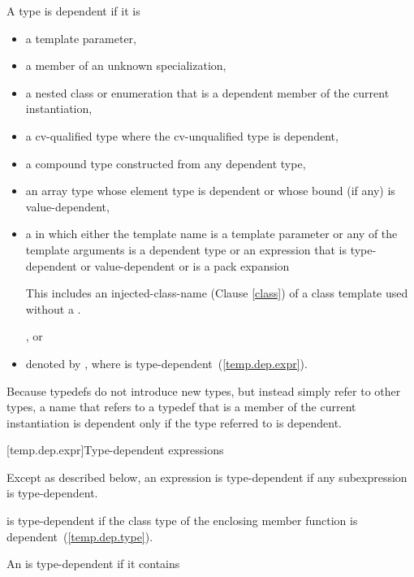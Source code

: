 \pnum
A type is dependent if it is
\begin{itemize}
\item
a template parameter,
\item
a member of an unknown specialization,
\item
a nested class or enumeration that is a dependent member of the current
instantiation,
\item
a cv-qualified type where the cv-unqualified type is dependent,
\item
a compound type constructed from any dependent type,
\item
an array type whose element type is dependent or whose
bound (if any) is value-dependent,
\item
a
in which either the template name is a template parameter or any of the
template arguments is a dependent type or an expression that is type-dependent
or value-dependent or is a pack expansion
\begin{note}
This includes an injected-class-name (Clause \ref{class}) of a class template
used without a .
\end{note}, or
\item denoted by \tcode{)},
where  is type-dependent~(\ref{temp.dep.expr}).
\end{itemize}

\pnum
\begin{note}
Because typedefs do not introduce new types, but
instead simply refer to other types, a name that refers to a
typedef that is a member of the current instantiation is dependent
only if the type referred to is dependent.
\end{note}

[temp.dep.expr]{Type-dependent expressions}

\pnum
Except as described below, an expression is type-dependent if any
subexpression is type-dependent.

\pnum
{}
is type-dependent if the class type of the enclosing member function is
dependent~(\ref{temp.dep.type}).

\pnum
An
is type-dependent if it contains

